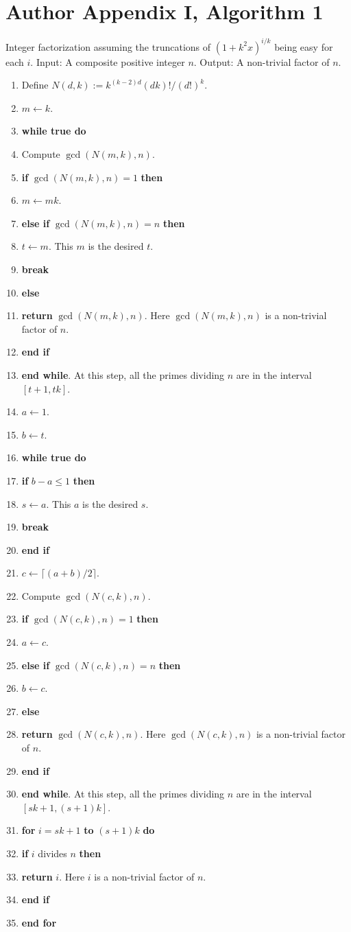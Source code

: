 \section*{Author Appendix I, Algorithm 1}
Integer factorization assuming the truncations of $(1+k^2x)^{i/k}$ being easy for each $i$. Input: A composite positive integer $n$. Output: A non-trivial factor of $n$.
\begin{enumerate}
\item Define $N(d,k):=k^{(k-2)d}(dk)!/(d!)^k$.
\item $m\leftarrow k$.
\item \textbf{while true do}
\item Compute $\gcd(N(m,k),n)$.
\item \textbf{if} $\gcd(N(m,k),n)=1$ \textbf{then}
\item $m\leftarrow mk$.
\item \textbf{else if} $\gcd(N(m,k),n)=n$ \textbf{then}
\item $t\leftarrow m$. This $m$ is the desired $t$.
\item \textbf{break}
\item \textbf{else}
\item \textbf{return} $\gcd(N(m,k),n)$. Here $\gcd(N(m,k),n)$ is a non-trivial factor of $n$.
\item \textbf{end if}
\item \textbf{end while}. At this step, all the primes dividing $n$ are in the interval $[t+1,tk]$.
\item $a\leftarrow1$.
\item $b\leftarrow t$.
\item \textbf{while true do}
\item \textbf{if} $b-a\le1$ \textbf{then}
\item $s\leftarrow a$. This $a$ is the desired $s$.
\item \textbf{break}
\item \textbf{end if}
\item $c\leftarrow\lceil(a+b)/2\rceil$.
\item Compute $\gcd(N(c,k),n)$.
\item \textbf{if} $\gcd(N(c,k),n)=1$ \textbf{then}
\item $a\leftarrow c$.
\item \textbf{else if} $\gcd(N(c,k),n)=n$ \textbf{then}
\item $b\leftarrow c$.
\item \textbf{else}
\item \textbf{return} $\gcd(N(c,k),n)$. Here $\gcd(N(c,k),n)$ is a non-trivial factor of $n$.
\item \textbf{end if}
\item \textbf{end while}. At this step, all the primes dividing $n$ are in the interval $[sk+1,(s+1)k]$.
\item \textbf{for} $i=sk+1$ \textbf{to} $(s+1)k$ \textbf{do}
\item \textbf{if} $i$ divides $n$ \textbf{then}
\item \textbf{return} $i$. Here $i$ is a non-trivial factor of $n$.
\item \textbf{end if}
\item \textbf{end for}
\end{enumerate}
